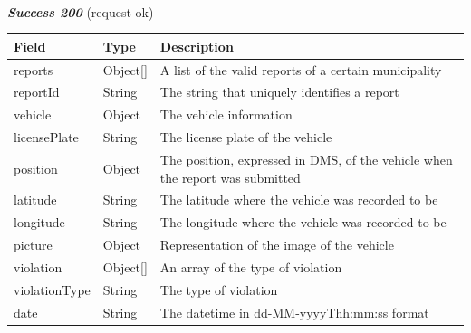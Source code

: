 						\paragraph{}
							\textit{\textbf{Success 200}} (request ok)
							\vspace{-2mm}
							\begin{table}[!h]
								\begin{tabular}{L{0.23\textwidth}L{0.15\textwidth}L{0.45\textwidth}}
									\toprule
									\textbf{Field} & \textbf{Type} & \textbf{Description} \\
									\midrule
									reports & Object[] & A list of the valid reports of a certain municipality \\
									\hspace{2.5mm}reportId & String & The string that uniquely identifies a report \\
									\hspace{2.5mm}vehicle & Object & The vehicle information \\
									\hspace{5mm}licensePlate & String & The license plate of the vehicle \\
									\hspace{2.5mm}position & Object & The position, expressed in DMS, of the vehicle when the report was submitted  \\
									\hspace{5mm}latitude & String & The latitude where the vehicle was recorded to be \\
									\hspace{5mm}longitude & String & The longitude where the vehicle was recorded to be \\
									\hspace{2.5mm}picture & Object & Representation of the image of the vehicle \\
									\hspace{2.5mm}violation & Object[] & An array of the type of violation \\
									\hspace{5mm}violationType & String & The type of violation \\
									\hspace{2.5mm}date & String & The datetime in \newline dd-MM-yyyyThh:mm:ss format \\
								 	\bottomrule
								\end{tabular}
							\end{table}
						\clearpage
